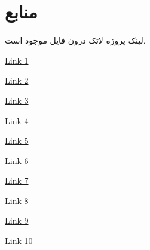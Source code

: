 \section{منابع}

لینک پروژه لاتک درون فایل
موجود است.

\vspace{1cm}
\small

\begin{latin}
    \href{https://www.varonis.com/blog/brute-force-attack}{Link 1}
    \newline
    
    \href{https://www.kaspersky.com/resource-center/definitions/brute-force-attack}{Link 2}
    \newline
    
    \href{https://www.quora.com/How-many-times-does-it-take-to-complete-a-brute-force-attack-up-to-8-characters-including-all-of-them}{Link 3}
    \newline
    
    \href{https://www.extremetech.com/extreme/316266-the-nvidia-rtx-3090-gpu-can-probably-crack-your-passwords}{Link 4}
    \newline
    
    \href{https://www.techradar.com/news/the-nvidia-geforce-rtx-3090-is-very-good-at-cracking-passwords-and-thats-bad-news}{Link 5}
    \newline
    
    \href{https://en.wikipedia.org/wiki/Substitution_cipher}{Link 6}
    \newline
    
    \href{https://www.includehelp.com/cryptography/substitution-techniques.aspx}{Link 7}
    \newline
    
    \href{http://practicalcryptography.com/ciphers/simple-substitution-cipher/}{Link 8}
    \newline
    
    \href{https://www.boxentriq.com/code-breaking/playfair-cipher}{Link 9}
    \newline
    
    \href{https://en.wikipedia.org/wiki/Polygraphic_substitution}{Link 10}
    \newline
\end{latin}




